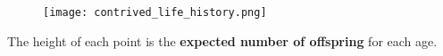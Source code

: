 \begin{figure}[h] 
    \centering 
    \texttt{[image: contrived\_life\_history.png]} 
\end{figure} 
\pause  
 
The height of each point is the \textbf{expected number of offspring} for each age. 
